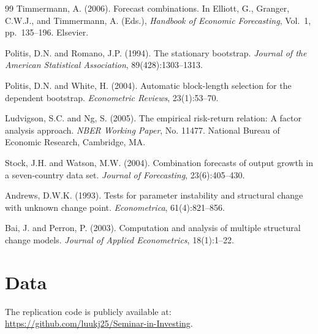 \documentclass[a4paper,11pt]{article}
\begin{document}
\begin{thebibliography}{99}
Timmermann, A. (2006).
Forecast combinations.
In Elliott, G., Granger, C.W.J., and Timmermann, A. (Eds.),
\textit{Handbook of Economic Forecasting}, Vol.~1, pp.~135--196. Elsevier.

Politis, D.N. and Romano, J.P. (1994).
The stationary bootstrap.
\textit{Journal of the American Statistical Association}, 89(428):1303--1313.

Politis, D.N. and White, H. (2004).
Automatic block-length selection for the dependent bootstrap.
\textit{Econometric Reviews}, 23(1):53--70.

Ludvigson, S.C. and Ng, S. (2005).
The empirical risk-return relation: A factor analysis approach.
\textit{NBER Working Paper}, No. 11477.
National Bureau of Economic Research, Cambridge, MA.

Stock, J.H. and Watson, M.W. (2004).
Combination forecasts of output growth in a seven-country data set.
\textit{Journal of Forecasting}, 23(6):405--430.

Andrews, D.W.K. (1993).
Tests for parameter instability and structural change with unknown change point.
\textit{Econometrica}, 61(4):821--856.

Bai, J. and Perron, P. (2003).
Computation and analysis of multiple structural change models.
\textit{Journal of Applied Econometrics}, 18(1):1--22.


\end{thebibliography}
\endgroup

\newpage

\appendix

\section{Data}\label{app:first}
The replication code is publicly available at: \href{URL}{https://github.com/luukj25/Seminar-in-Investing}.
\\
\end{document}
